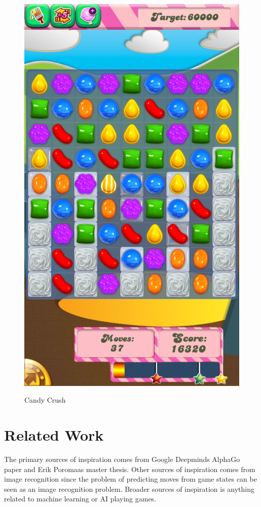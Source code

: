 \documentclass{kththesis}
\begin{document}
\begin{figure}
\centering
\includegraphics[width=\textwidth]{images/candy_crush.png}
\label{fig:candy_crush}
\caption{Candy Crush}
\end{figure}

\chapter{Related Work}
The primary sources of inspiration comes from  Google Deepminds AlphaGo paper and Erik Poromaas master thesis. Other sources of inspiration comes from image recognition since the problem of predicting moves from game states can be seen as an image recognition problem.  Broader sources of inspiration is anything related to machine learning or AI playing games.
\end{document}
